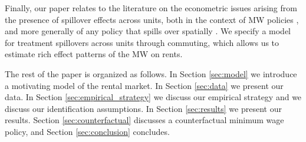 Finally, our paper relates to the literature on the econometric issues arising 
from the presence of spillover effects across units,
both in the context of MW policies \parencite{Kuehn2016, Huang2020}, 
and more generally of any policy that spills over spatially
\parencite{DelgadoFlorax2015, Butts2021}.
We specify a model for treatment spillovers across units through commuting, 
which allows us to estimate rich effect patterns of the MW on rents.

The rest of the paper is organized as follows.
In Section \ref{sec:model} we introduce a motivating model of the rental market.
In Section \ref{sec:data} we present our data.
In Section \ref{sec:empirical_strategy} we discuss our empirical strategy and
we discuss our identification assumptions.
In Section \ref{sec:results} we present our results.
Section \ref{sec:counterfactual} discusses a counterfactual minimum wage policy, and
Section \ref{sec:conclusion} concludes.
